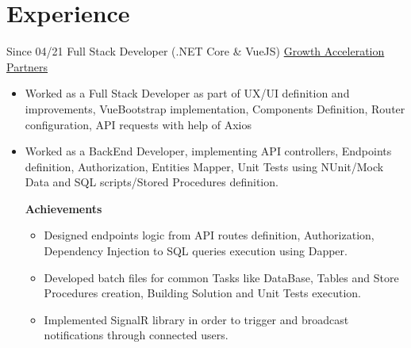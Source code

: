 \documentclass[letterpaper]{twentysecondcv} %
\begin{document}
\section{Experience}
    \begin{twenty}
        \twentyitem
        {Since 04/21}
        {Full Stack Developer (.NET Core \& VueJS)}
        { \href{https://www.growthaccelerationpartners.com/}{Growth Acceleration Partners}}
        {
            \begin{itemize}
                \item Worked as a Full Stack Developer as part of UX/UI definition and improvements, VueBootstrap implementation, Components Definition, Router configuration, API requests with help of Axios
                
                \item Worked as a BackEnd Developer, implementing API controllers, Endpoints definition, Authorization, Entities Mapper, Unit Tests using NUnit/Mock Data and SQL scripts/Stored Procedures definition.
                
                \textbf{Achievements}
                \begin{itemize}

                    
                    \item Designed endpoints logic from API routes definition, Authorization, Dependency Injection to SQL queries execution using Dapper.
                    
                    
                    \item Developed batch files for common Tasks like DataBase, Tables and Store Procedures creation, Building Solution and Unit Tests execution.
                    
                    \item Implemented SignalR library in order to trigger and broadcast notifications through connected users.
                    
                    

\end{itemize}
\end{itemize}}
\end{twenty}
\end{document}
